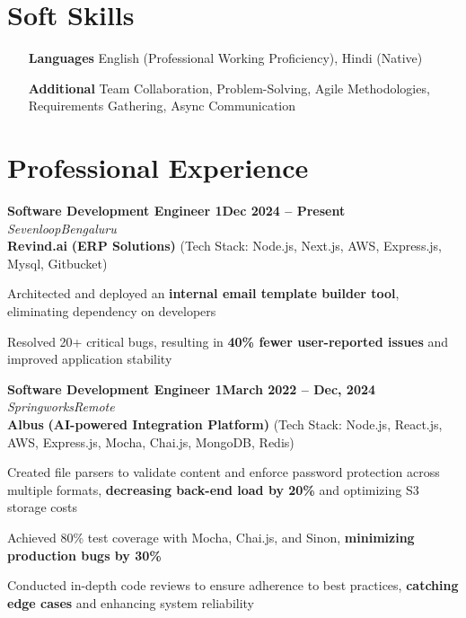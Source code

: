 \documentclass[letterpaper, 10pt]{article}
\newcommand{\heading}[2]{ \hspace{5pt}#1\hfill#2\\[1pt] }  %
\newcommand{\headingBf}[2]{ \heading{\textbf{#1}}{\textbf{#2}} }
\newcommand{\headingIt}[2]{ \heading{\textit{#1}}{\textit{#2}} }
\newenvironment{resume_list}{
\vspace{-3pt}                    %
\begin{itemize}[itemsep=-2pt, parsep=0.5pt, leftmargin=20pt] }{ \end{itemize}  %
\vspace{-3pt}                    %
}
\begin{document}
\section{Soft Skills}
\begin{itemize}[itemsep=0pt, parsep=2pt, leftmargin=70pt]
    \item[\textbf{Languages}] English (Professional Working Proficiency), Hindi
    (Native)
    
    \item[\textbf{Additional}] Team Collaboration, Problem-Solving, Agile Methodologies,
    Requirements Gathering, Async Communication
\end{itemize}

\section{Professional Experience}
\headingBf{Software Development Engineer 1}{Dec 2024 -- Present}
\headingIt{Sevenloop}{Bengaluru}
\vspace{2pt}
\hspace{10pt}\textbf{Revind.ai} \textbf{(ERP Solutions)} \small{(Tech Stack: Node.js, Next.js, AWS, Express.js, Mysql, Gitbucket)}
\begin{resume_list}
    \item Architected and deployed an \textbf{internal email template builder tool}, eliminating dependency on developers
    \item Resolved 20+ critical bugs, resulting in \textbf{40\% fewer user-reported issues} and improved application stability
\end{resume_list}

\vspace{3pt}

\headingBf{Software Development Engineer 1}{March 2022 -- Dec, 2024}
\headingIt{Springworks}{Remote}
\vspace{2pt}
\hspace{10pt}\textbf{Albus} \textbf{(AI-powered Integration Platform)} \small{(Tech Stack: Node.js, React.js, AWS, Express.js, Mocha, Chai.js, MongoDB, Redis)}
\begin{resume_list}
    \item Created file parsers to validate content and enforce password protection across multiple formats, \textbf{decreasing back-end load by 20\%} and optimizing S3 storage costs 
    \item Achieved 80\% test coverage with Mocha, Chai.js, and Sinon, \textbf{minimizing production bugs by 30\%}
    \item Conducted in-depth code reviews to ensure adherence to best practices, \textbf{catching edge cases} and enhancing system reliability
\end{resume_list}
\end{document}
